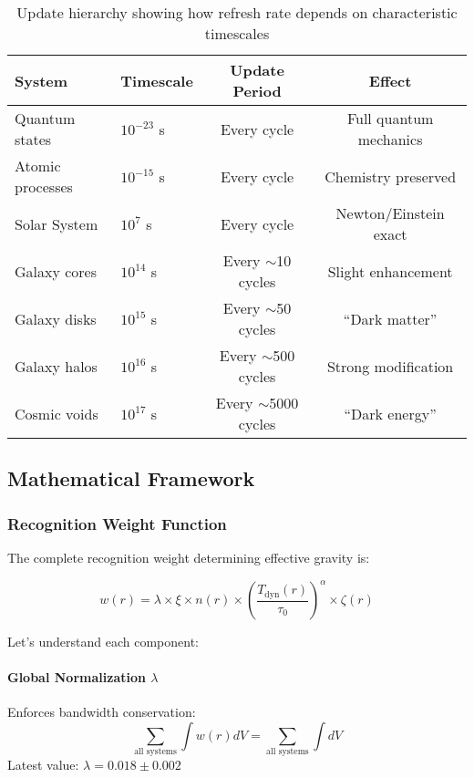 \documentclass[12pt,letterpaper]{article}
\newcommand{\tdyn}{T_{\text{dyn}}}
\begin{document}
\begin{table}[h]
\centering
\begin{tabular}{llcc}
\toprule
\textbf{System} & \textbf{Timescale} & \textbf{Update Period} & \textbf{Effect} \\
\midrule
Quantum states & $10^{-23}$ s & Every cycle & Full quantum mechanics \\
Atomic processes & $10^{-15}$ s & Every cycle & Chemistry preserved \\
Solar System & $10^7$ s & Every cycle & Newton/Einstein exact \\
Galaxy cores & $10^{14}$ s & Every $\sim$10 cycles & Slight enhancement \\
Galaxy disks & $10^{15}$ s & Every $\sim$50 cycles & ``Dark matter'' \\
Galaxy halos & $10^{16}$ s & Every $\sim$500 cycles & Strong modification \\
Cosmic voids & $10^{17}$ s & Every $\sim$5000 cycles & ``Dark energy'' \\
\bottomrule
\end{tabular}
\caption{Update hierarchy showing how refresh rate depends on characteristic timescales}
\end{table}

\subsection{Mathematical Framework}

\subsubsection{Recognition Weight Function}

The complete recognition weight determining effective gravity is:

\begin{equation}
\boxed{w(r) = \lambda \times \xi \times n(r) \times \left(\frac{\tdyn(r)}{\tau_0}\right)^\alpha \times \zeta(r)}
\end{equation}

Let's understand each component:

\paragraph{Global Normalization $\lambda$}
Enforces bandwidth conservation:
\begin{equation}
\sum_{\text{all systems}} \int w(r) dV = \sum_{\text{all systems}} \int dV
\end{equation}
Latest value: $\lambda = 0.018 \pm 0.002$
\end{document}

